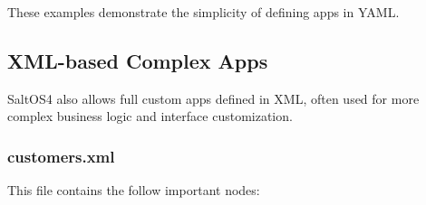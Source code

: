 \documentclass[a4paper]{article}
\begin{document}
These examples demonstrate the simplicity of defining apps in YAML.

\hypertarget{toc18}{}
\subsection{XML-based Complex Apps}

SaltOS4 also allows full custom apps defined in XML, often used for more complex business logic and interface customization.

\hypertarget{toc19}{}
\subsubsection{customers.xml}

This file contains the follow important nodes:
\end{document}
